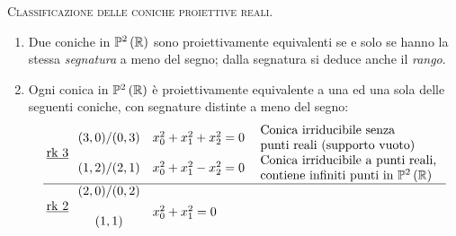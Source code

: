 	\begin{theorema}\textsc{Classificazione delle coniche proiettive reali}.
	\begin{enumerate}
	\item	 Due coniche in $\proj[2]{\realset}$ sono proiettivamente equivalenti se e solo se hanno la stessa \textit{segnatura} a meno del segno; dalla segnatura si deduce anche il \textit{rango}.
	\item	Ogni conica in $\proj[2]{\realset}$ è proiettivamente equivalente a una ed una sola delle seguenti coniche, con segnature distinte a meno del segno:
	\begin{equation*}
		\arraycolsep=2.5pt
		\begin{array}{ccll}
			\underline{\rk 3} & \begin{array}{l}
					(3,0)/(0,3) \\
					\\
					(1,2)/(2,1)
				\end{array} & \begin{array}{l}
				x_0^2+x_1^2+x_2^2=0\\
				\\
				x_0^2+x_1^2-x_2^2=0\\
			\end{array} 
				 & \begin{array}{l}
			\begin{array}{l}
				\text{Conica irriducibile senza} \\
				\text{punti reali (supporto vuoto)}
			\end{array} \\
			\begin{array}{l}
				\text{Conica irriducibile a punti reali,} \\
				\text{contiene infiniti punti in }\proj[2]{\realset}
			\end{array}
		\end{array}\\ \hline %
		\underline{\rk 2} &\begin{array}{c}
		(2,0)/(0,2) \\
		\\
		(1,1)
		\end{array} &\begin{array}{l}
		\\[-1mm]
		x_0^2+x_1^2=0 \\

\end{array}
\end{array}
\end{equation*}
\end{enumerate}
\end{theorema}
